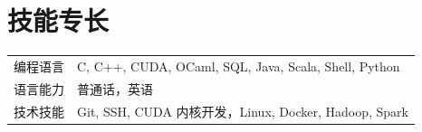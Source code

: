\documentclass[a4paper,12pt]{article}
\begin{document}

\section{技能专长}
\begin{tabularx}{\linewidth}{@{}l X@{}}
编程语言 &  \normalsize{C, C++, CUDA, OCaml, SQL, Java, Scala, Shell, Python} \\
语言能力 &  \normalsize{普通话，英语} \\
技术技能 & \normalsize{Git, SSH, CUDA 内核开发，Linux, Docker, Hadoop, Spark} \\
\end{tabularx}

\vfill
{}
\end{document}
